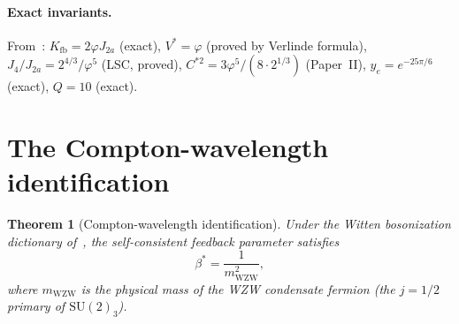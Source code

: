 \documentclass[11pt,a4paper]{article}
\newtheorem{theorem}{Theorem}[section]
\theoremstyle{definition}
\theoremstyle{remark}
\newcommand{\vp}{\varphi}
\newcommand{\bst}{\beta^{*}}
\newcommand{\Kfb}{K_{\mathrm{fb}}}
\newcommand{\Ja}{J_{2a}}
\newcommand{\Jfour}{J_{4}}
\newcommand{\mWZW}{m_{\mathrm{WZW}}}
\begin{document}
\paragraph{Exact invariants.}
From~\cite{Paper1,Paper2,Paper3}:
$\Kfb = 2\vp\Ja$ (exact), $V^* = \vp$ (proved by Verlinde formula),
$\Jfour/\Ja = 2^{4/3}/\vp^5$ (LSC, proved), $C^{*2} = 3\vp^5/(8\cdot 2^{1/3})$
(Paper~II), $y_e = e^{-25\pi/6}$ (exact), $Q = 10$ (exact).

\section{The Compton-wavelength identification}
\label{P4:sec:compton}

\begin{theorem}[Compton-wavelength identification]
\label{P4:thm:compton}
Under the Witten bosonization dictionary of~\cite{Paper3}, the
self-consistent feedback parameter satisfies
\[
  \bst = \frac{1}{\mWZW^2},
\]
where $\mWZW$ is the physical mass of the WZW condensate fermion
(the $j=1/2$ primary of $\mathrm{SU}(2)_3$).
\end{theorem}
\end{document}

